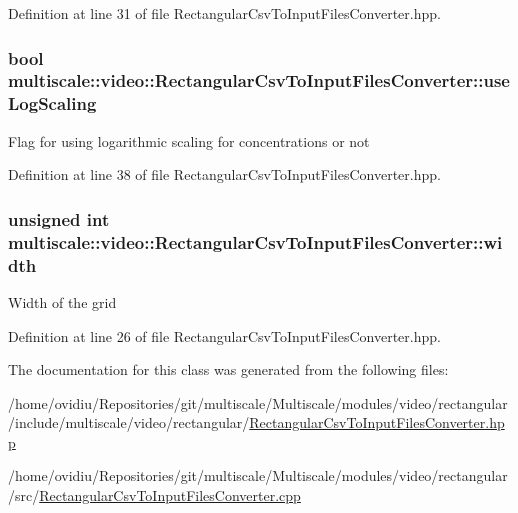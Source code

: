 \-Definition at line 31 of file \-Rectangular\-Csv\-To\-Input\-Files\-Converter.\-hpp.

\hypertarget{classmultiscale_1_1video_1_1RectangularCsvToInputFilesConverter_a7739ee04a9340d981896861904022f26}{
\subsubsection[{use\-Log\-Scaling}]{\setlength{\rightskip}{0pt plus 5cm}bool {\bf multiscale\-::video\-::\-Rectangular\-Csv\-To\-Input\-Files\-Converter\-::use\-Log\-Scaling}}}\label{classmultiscale_1_1video_1_1RectangularCsvToInputFilesConverter_a7739ee04a9340d981896861904022f26}
\-Flag for using logarithmic scaling for concentrations or not 

\-Definition at line 38 of file \-Rectangular\-Csv\-To\-Input\-Files\-Converter.\-hpp.

\hypertarget{classmultiscale_1_1video_1_1RectangularCsvToInputFilesConverter_a7fe7f3d014535567fbeb465eb01cde1b}{
\subsubsection[{width}]{\setlength{\rightskip}{0pt plus 5cm}unsigned int {\bf multiscale\-::video\-::\-Rectangular\-Csv\-To\-Input\-Files\-Converter\-::width}}}\label{classmultiscale_1_1video_1_1RectangularCsvToInputFilesConverter_a7fe7f3d014535567fbeb465eb01cde1b}
\-Width of the grid 

\-Definition at line 26 of file \-Rectangular\-Csv\-To\-Input\-Files\-Converter.\-hpp.



\-The documentation for this class was generated from the following files\-:\begin{DoxyCompactItemize}
\item 
/home/ovidiu/\-Repositories/git/multiscale/\-Multiscale/modules/video/rectangular/include/multiscale/video/rectangular/\hyperlink{RectangularCsvToInputFilesConverter_8hpp}{\-Rectangular\-Csv\-To\-Input\-Files\-Converter.\-hpp}\item 
/home/ovidiu/\-Repositories/git/multiscale/\-Multiscale/modules/video/rectangular/src/\hyperlink{RectangularCsvToInputFilesConverter_8cpp}{\-Rectangular\-Csv\-To\-Input\-Files\-Converter.\-cpp}\end{DoxyCompactItemize}

